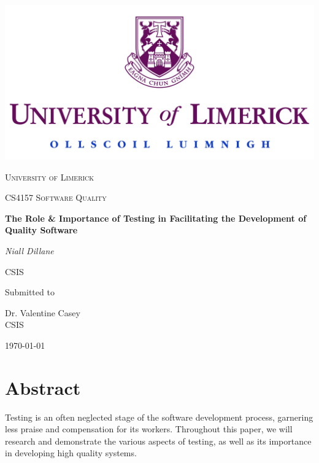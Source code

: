 \documentclass[12pt]{article}
\begin{document}
\thispagestyle{empty}
\setlength\headheight{0pt} 
\begin{center}

\begin{center}
\includegraphics[width=0.65\linewidth]{images/UL_logo.jpg}            
\end{center}	

        \vspace{0.25cm}
        {\scshape\LARGE University of Limerick \par}
        \vspace{0.25cm}
        {\scshape\Large CS4157 Software Quality\par}
        \vspace{0.5cm}

        {\Large\bfseries The Role \& Importance of Testing in Facilitating the Development of Quality Software\par}
        
        \vspace{0.5cm}
        {\Large\itshape Niall Dillane\par}
        CSIS
        \vspace{0.25cm}

\vspace{1cm}
Submitted to\par
Dr. Valentine Casey \\
CSIS\par
\vspace{1.5cm}
\large
\today

\end{center}

\clearpage
\restoregeometry
\justify

\section*{Abstract}

Testing is an often neglected stage of the software development process, garnering less praise and compensation for its workers. Throughout this paper, we will research and demonstrate the various aspects of testing, as well as its importance in developing high quality systems. 
\end{document}
